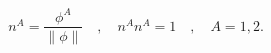 \begin{equation}
n^A=\frac{\phi ^A}{\|\phi \|}\quad ,\quad n^An^A=1\quad ,\quad
A=1,2.
\end{equation}

